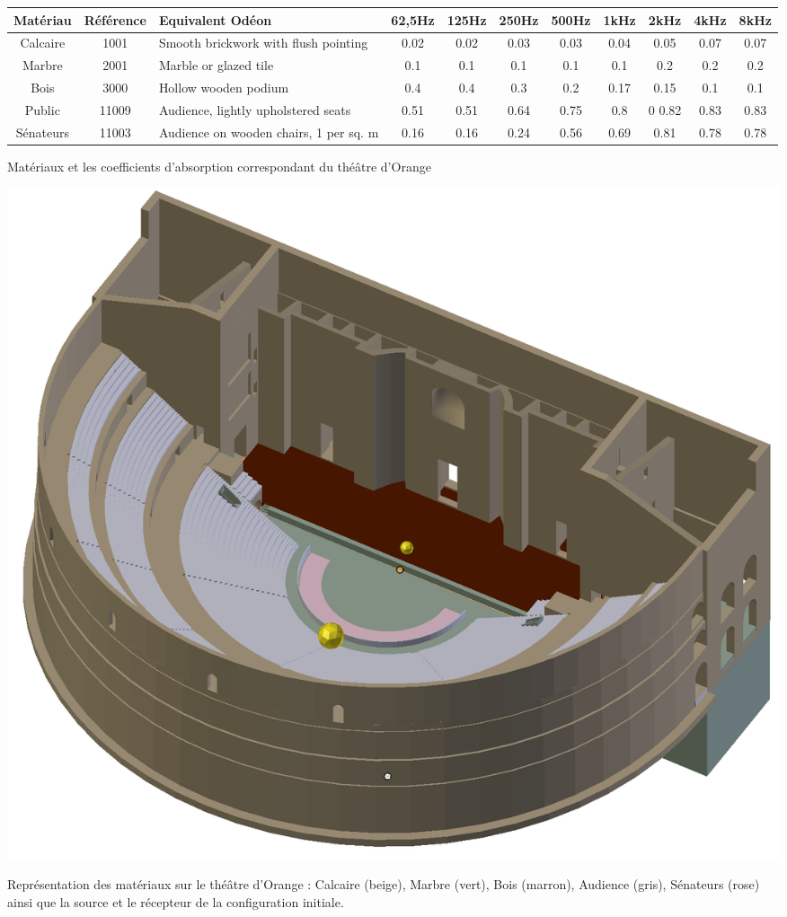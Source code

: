 %
\begin{tableth} 
\footnotesize
	\begin{tabular}{| c | c | m{2cm} | *{8}{c|}}
		\hline
		Matériau &Référence & Equivalent Odéon & 62,5Hz & 125Hz & 250Hz & 500Hz & 1kHz & 2kHz & 4kHz & 8kHz \\
		  \hline
		  \hline
		   Calcaire & 1001 & Smooth brickwork with flush pointing\footnotemark & 0.02&	0.02&	0.03&	0.03&	0.04&	0.05&	0.07&	0.07 \\
		   \hline
		Marbre &2001 & Marble or glazed tile\footnotemark & 0.1 & 0.1 & 0.1 & 0.1 & 0.1 & 0.2 & 0.2 & 0.2 \\
		   \hline
		Bois & 3000 & Hollow wooden podium\footnotemark & 0.4&0.4&0.3&	0.2&	0.17& 0.15& 0.1&	0.1 \\
		   \hline
		Public & 11009 & Audience, lightly upholstered seats\footnotemark & 0.51&	0.51&	0.64&	0.75&	0.8&0	0.82&	0.83&	0.83 \\
	     \hline
	     		Sénateurs & 11003 & Audience on wooden chairs, 1 per sq. m\footnotemark & 0.16 & 0.16 & 0.24 & 0.56 & 0.69 & 0.81 & 0.78 & 0.78 \\
	     \hline

	 \end{tabular}
	\caption{Matériaux et les coefficients d'absorption correspondant du théâtre d'Orange}
	\label{matOdeon}
\end{tableth}
\addtocounter{footnote}{-1}
\addtocounter{footnote}{-1}
\addtocounter{footnote}{-1}
\addtocounter{footnote}{1}
\addtocounter{footnote}{1}

\begin{figureth}
	\includegraphics[width=0.7\linewidth]{images/theatreMat}
	\caption{Représentation des matériaux sur le théâtre d'Orange : Calcaire (beige), Marbre (vert), Bois (marron), Audience (gris), Sénateurs (rose) ainsi que la source et le récepteur de la configuration initiale.}
	\label{theatreMat}
\end{figureth}

